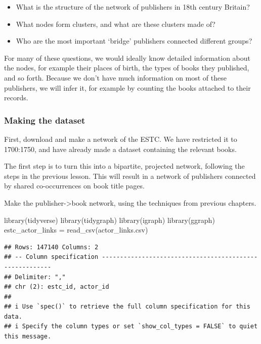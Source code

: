 \documentclass[
]{book}
\newenvironment{Shaded}{\begin{snugshade}}{\end{snugshade}}
\newcommand{\FunctionTok}[1]{\textcolor[rgb]{0.00,0.00,0.00}{#1}}
\newcommand{\NormalTok}[1]{#1}
\newcommand{\OtherTok}[1]{\textcolor[rgb]{0.56,0.35,0.01}{#1}}
\newcommand{\StringTok}[1]{\textcolor[rgb]{0.31,0.60,0.02}{#1}}
\begin{document}
\begin{itemize}
\item
  What is the structure of the network of publishers in 18th century Britain?
\item
  What nodes form clusters, and what are these clusters made of?
\item
  Who are the most important `bridge' publishers connected different groups?
\end{itemize}

For many of these questions, we would ideally know detailed information about the nodes, for example their places of birth, the types of books they published, and so forth. Because we don't have much information on most of these publishers, we will infer it, for example by counting the books attached to their records.

\hypertarget{making-the-dataset}{%
\subsubsection{Making the dataset}\label{making-the-dataset}}

First, download and make a network of the ESTC. We have restricted it to 1700:1750, and have already made a dataset containing the relevant books.

The first step is to turn this into a bipartite, projected network, following the steps in the previous lesson. This will result in a network of publishers connected by shared co-occurrences on book title pages.

Make the publisher-\textgreater book network, using the techniques from previous chapters.

\begin{Shaded}
\begin{Highlighting}[]
\FunctionTok{library}\NormalTok{(tidyverse)}
\FunctionTok{library}\NormalTok{(tidygraph)}
\FunctionTok{library}\NormalTok{(igraph)}
\FunctionTok{library}\NormalTok{(ggraph)}
\NormalTok{estc\_actor\_links }\OtherTok{=} \FunctionTok{read\_csv}\NormalTok{(}\StringTok{\textquotesingle{}actor\_links.csv\textquotesingle{}}\NormalTok{)}
\end{Highlighting}
\end{Shaded}

\begin{verbatim}
## Rows: 147140 Columns: 2
## -- Column specification --------------------------------------------------------
## Delimiter: ","
## chr (2): estc_id, actor_id
## 
## i Use `spec()` to retrieve the full column specification for this data.
## i Specify the column types or set `show_col_types = FALSE` to quiet this message.
\end{verbatim}
\end{document}

